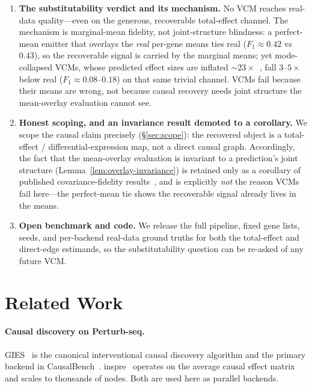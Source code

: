\documentclass{article}
\theoremstyle{plain}
\theoremstyle{definition}
\theoremstyle{remark}
\begin{document}
\begin{enumerate}
\item \textbf{The substitutability verdict and its mechanism.} No VCM reaches real-data quality---even on the generous, recoverable total-effect channel. The mechanism is marginal-mean fidelity, not joint-structure blindness: a perfect-mean emitter that overlays the \emph{real} per-gene means ties real ($F_1\approx0.42$ vs $0.43$), so the recoverable signal is carried by the marginal means; yet mode-collapsed VCMs, whose predicted effect sizes are inflated $\sim\!23\times$~\citep{mejia2025diversity}, fall $3$--$5\times$ below real ($F_1\approx0.08$--$0.18$) on that same trivial channel. VCMs fail because their means are wrong, not because causal recovery needs joint structure the mean-overlay evaluation cannot see.

\item \textbf{Honest scoping, and an invariance result demoted to a corollary.} We scope the causal claim precisely (\S\ref{sec:scope}): the recovered object is a total-effect / differential-expression map, not a direct causal graph. Accordingly, the fact that the mean-overlay evaluation is invariant to a prediction's joint structure (Lemma~\ref{lem:overlay-invariance}) is retained only as a corollary of published covariance-fidelity results~\citep{riasat2026marginals,rubbi2026ggeval}, and is explicitly \emph{not} the reason VCMs fail here---the perfect-mean tie shows the recoverable signal already lives in the means.

\item \textbf{Open benchmark and code.} We release the full pipeline, fixed gene lists, seeds, and per-backend real-data ground truths for both the total-effect and direct-edge estimands, so the substitutability question can be re-asked of any future VCM.
\end{enumerate}

\section{Related Work}
\label{sec:related}

\paragraph{Causal discovery on Perturb-seq.} GIES~\citep{hauser2012gies} is the canonical interventional causal discovery algorithm and the primary backend in CausalBench~\citep{chevalley2025causalbench}. inspre~\citep{brown2025inspre} operates on the average causal effect matrix and scales to thousands of nodes. Both are used here as parallel backends.
\end{document}
